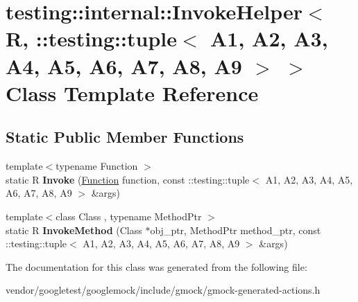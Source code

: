 \hypertarget{classtesting_1_1internal_1_1_invoke_helper_3_01_r_00_01_1_1testing_1_1tuple_3_01_a1_00_01_a2_00_cb3e0694d0722fcc616ae618dc383e5b}{}\section{testing\+:\+:internal\+:\+:Invoke\+Helper$<$ R, \+:\+:testing\+:\+:tuple$<$ A1, A2, A3, A4, A5, A6, A7, A8, A9 $>$ $>$ Class Template Reference}
\label{classtesting_1_1internal_1_1_invoke_helper_3_01_r_00_01_1_1testing_1_1tuple_3_01_a1_00_01_a2_00_cb3e0694d0722fcc616ae618dc383e5b}
\subsection*{Static Public Member Functions}
\begin{DoxyCompactItemize}
\item 
\mbox{\label{classtesting_1_1internal_1_1_invoke_helper_3_01_r_00_01_1_1testing_1_1tuple_3_01_a1_00_01_a2_00_cb3e0694d0722fcc616ae618dc383e5b_afd0d2a5a81d947b5b11dc2ede6e49a0e}} 
{\footnotesize template$<$typename Function $>$ }\\static R {\bfseries Invoke} (\mbox{\hyperlink{structtesting_1_1internal_1_1_function}{Function}} function, const \+::testing\+::tuple$<$ A1, A2, A3, A4, A5, A6, A7, A8, A9 $>$ \&args)
\item 
\mbox{\label{classtesting_1_1internal_1_1_invoke_helper_3_01_r_00_01_1_1testing_1_1tuple_3_01_a1_00_01_a2_00_cb3e0694d0722fcc616ae618dc383e5b_ab468cf4a3e1ff2fa33a60ce3459c17f7}} 
{\footnotesize template$<$class Class , typename Method\+Ptr $>$ }\\static R {\bfseries Invoke\+Method} (Class $\ast$obj\+\_\+ptr, Method\+Ptr method\+\_\+ptr, const \+::testing\+::tuple$<$ A1, A2, A3, A4, A5, A6, A7, A8, A9 $>$ \&args)
\end{DoxyCompactItemize}


The documentation for this class was generated from the following file\+:\begin{DoxyCompactItemize}
\item 
vendor/googletest/googlemock/include/gmock/gmock-\/generated-\/actions.\+h\end{DoxyCompactItemize}
